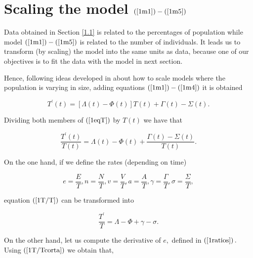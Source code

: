 \section{Scaling the model $(\ref{1m1}) -(\ref{1m5})$}\label{1.3}

Data obtained in Section \ref{1.1} is related to the percentages of
population while model $\left( \ref{1m1}\right) -\left( \ref{1m5}\right)$
is related to the number of individuals. It leads us to transform (by scaling) the
model into the same units as data, because one of our objectives is to fit the
data with the model in next section.

Hence, following ideas developed in \cite{Martcheva, Mena, scaling} about how
to scale models where the population is varying in size, adding equations 
$\left( \ref{1m1}\right) -\left( \ref{1m4}\right)$ it is obtained

\begin{equation}
T^{\prime }\left( t\right) =\left[ \Lambda \left( t\right) -\Phi \left(
t\right) \right] T\left( t\right) +\Gamma \left( t\right) -\Sigma \left(
t\right).  \label{1eqT}
\end{equation}

Dividing both members of $\left( \ref{1eqT}\right) $ by $T\left( t\right) $
we have that

\begin{equation}
\frac{T^{\prime }\left( t\right) }{T\left( t\right) }=\Lambda \left(
t\right) -\Phi \left( t\right) +\frac{\Gamma \left( t\right) -\Sigma \left(
t\right) }{T\left( t\right) }.  \label{1T/T}
\end{equation}

On the one hand, if we define the rates (depending on time)

\begin{equation}
e=\frac{E}{T},n=\frac{N}{T},v=\frac{V}{T},a=\frac{A}{T},\gamma =\frac{\Gamma 
}{T},\sigma =\frac{\Sigma }{T},  \label{1ratios}
\end{equation}

equation $\left( \ref{1T/T}\right) $ can be transformed into

\begin{equation}
\frac{T^{\prime }}{T}=\Lambda -\Phi +\gamma -\sigma .  \label{1T/Tcorta}
\end{equation}

On the other hand, let us compute the derivative of $e,$ defined in 
$\left(\ref{1ratios}\right).$ Using $\left(\ref{1T/Tcorta}\right)$ we obtain that,

